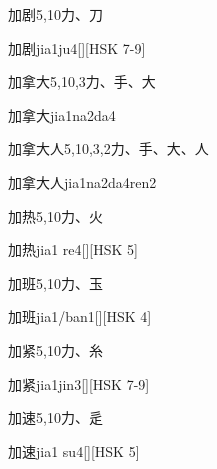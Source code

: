 \begin{Entry}{加剧}{5,10}{⼒、⼑}
  \begin{Phonetics}{加剧}{jia1ju4}[][HSK 7-9]
  \end{Phonetics}
\end{Entry}

\begin{Entry}{加拿大}{5,10,3}{⼒、⼿、⼤}
  \begin{Phonetics}{加拿大}{jia1na2da4}
  \end{Phonetics}
\end{Entry}

\begin{Entry}{加拿大人}{5,10,3,2}{⼒、⼿、⼤、⼈}
  \begin{Phonetics}{加拿大人}{jia1na2da4ren2}
  \end{Phonetics}
\end{Entry}

\begin{Entry}{加热}{5,10}{⼒、⽕}
  \begin{Phonetics}{加热}{jia1 re4}[][HSK 5]
  \end{Phonetics}
\end{Entry}

\begin{Entry}{加班}{5,10}{⼒、⽟}
  \begin{Phonetics}{加班}{jia1/ban1}[][HSK 4]
  \end{Phonetics}
\end{Entry}

\begin{Entry}{加紧}{5,10}{⼒、⽷}
  \begin{Phonetics}{加紧}{jia1jin3}[][HSK 7-9]
  \end{Phonetics}
\end{Entry}

\begin{Entry}{加速}{5,10}{⼒、⾡}
  \begin{Phonetics}{加速}{jia1 su4}[][HSK 5]
  \end{Phonetics}
\end{Entry}

